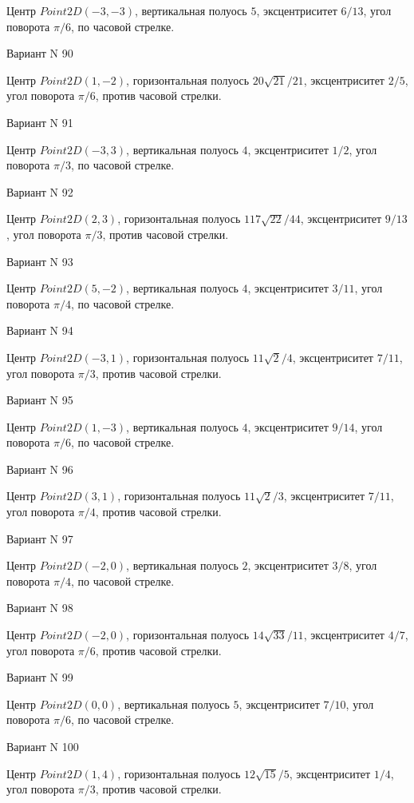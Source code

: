\documentclass[11pt]{report}
\begin{document}
Центр $Point2D\left(-3, -3\right)$, вертикальная полуось $5$, эксцентриситет $6 / 13$, угол поворота $\pi / 6$, по часовой стрелке.

Вариант N 90

Центр $Point2D\left(1, -2\right)$, горизонтальная полуось $20 \sqrt{21} / 21$, эксцентриситет $2 / 5$, угол поворота $\pi / 6$, против часовой стрелки.

Вариант N 91

Центр $Point2D\left(-3, 3\right)$, вертикальная полуось $4$, эксцентриситет $1 / 2$, угол поворота $\pi / 3$, по часовой стрелке.

Вариант N 92

Центр $Point2D\left(2, 3\right)$, горизонтальная полуось $117 \sqrt{22} / 44$, эксцентриситет $9 / 13$, угол поворота $\pi / 3$, против часовой стрелки.

Вариант N 93

Центр $Point2D\left(5, -2\right)$, вертикальная полуось $4$, эксцентриситет $3 / 11$, угол поворота $\pi / 4$, по часовой стрелке.

Вариант N 94

Центр $Point2D\left(-3, 1\right)$, горизонтальная полуось $11 \sqrt{2} / 4$, эксцентриситет $7 / 11$, угол поворота $\pi / 3$, против часовой стрелки.

Вариант N 95

Центр $Point2D\left(1, -3\right)$, вертикальная полуось $4$, эксцентриситет $9 / 14$, угол поворота $\pi / 6$, по часовой стрелке.

Вариант N 96

Центр $Point2D\left(3, 1\right)$, горизонтальная полуось $11 \sqrt{2} / 3$, эксцентриситет $7 / 11$, угол поворота $\pi / 4$, против часовой стрелки.

Вариант N 97

Центр $Point2D\left(-2, 0\right)$, вертикальная полуось $2$, эксцентриситет $3 / 8$, угол поворота $\pi / 4$, по часовой стрелке.

Вариант N 98

Центр $Point2D\left(-2, 0\right)$, горизонтальная полуось $14 \sqrt{33} / 11$, эксцентриситет $4 / 7$, угол поворота $\pi / 6$, против часовой стрелки.

Вариант N 99

Центр $Point2D\left(0, 0\right)$, вертикальная полуось $5$, эксцентриситет $7 / 10$, угол поворота $\pi / 6$, по часовой стрелке.

Вариант N 100

Центр $Point2D\left(1, 4\right)$, горизонтальная полуось $12 \sqrt{15} / 5$, эксцентриситет $1 / 4$, угол поворота $\pi / 3$, против часовой стрелки.
\end{document}
